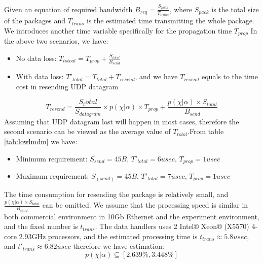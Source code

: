 \documentclass[11pt,openright,a4paper]{report}
\begin{document}
Given an equation of required bandwidth $B_{req}=\frac{S_{pack}}{T_{trans}}$, where $S_{pack}$ is the total size of the packages and $T_{trans}$ is the estimated time transmitting the whole package. We introduces another time variable specifically for the propagation time $T_{prop}$ In the above two scenarios, we have:
\begin{itemize}
	\item No data loss: $T_{totoal}=T_{prop}+\frac{S_{total}}{B_{send}}$
	\item With data loss: ${T}'_{total}=T_{total}+T_{resend}$, and we have $T_{resend}$ equals to the time cost in resending UDP datagram
\end{itemize}
\begin{equation}
T_{resend}=\frac{S_total}{S_{datagram}}\times p(\chi|\alpha) \times T_{prop} + \frac{p(\chi | \alpha) \times S_{total}}{B_{send}}
\end{equation}
Assuming that UDP datagram lost will happen in most cases, therefore the second scenario can be viewed as the average value of $T_{total}.$From table \ref{tab:lowlmdm} we have:
\begin{itemize}
	\item Minimum requirement: $S_{send}=45B$, ${T}'_{total}=6usec$, $T_{prop}=1usec$
	\item Maximum requirement: $S_(send)=45B$, ${T}'_{total}=7usec$, $T_{prop}=1usec$
\end{itemize} 
The time consumption for resending the package is relatively small, and $\frac{p(\chi | \alpha) \times S_{total}}{B_{send}}$ can be omitted. We assume that the processing speed is similar in both commercial environment in 10Gb Ethernet and the experiment environment, and the fixed number is $t_{trans}$. The data handlers uses 2 Intel® Xeon® (X5570) 4-core 2.93GHz processors\cite{ibm2011highfrequency}, and the estimated processing time is $t_{trans} \approx 5.8usec$, and ${t}'_{trans} \approx 6.82usec$ therefore we have estimation: 
\begin{equation}
	p(\chi | \alpha) \subseteq [2.639\%, 3.448\%] 
\end{equation}
\end{document}
